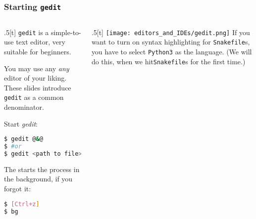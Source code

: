 \begin{frame}[fragile]
  \frametitle{Starting \texttt{gedit}}
  \begin{columns}[t]
  	 \begin{column}{.5\textwidth}[t]
  	   \texttt{gedit} is a simple-to-use text editor, very suitable for beginners.\newline
  	   \begin{hint}
  	     You may use any \emph{any} editor of your liking. These slides introduce \texttt{gedit} as a common denominator.
  	   \end{hint}
        Start \textit{gedit}:
       \begin{lstlisting}[language=Bash, style=Shell]
$ gedit @&@
$ #or
$ gedit <path to file> @&@
      \end{lstlisting}
      The  starts the process in the background, if you forgot it:
      \begin{lstlisting}[language=Bash, style=Shell]
$ [Ctrl+z]
$ bg
      \end{lstlisting}	
    \end{column}
    \begin{column}{.5\textwidth}[t]
      \texttt{[image: editors\_and\_IDEs/gedit.png]}	
      If you want to turn on syntax highlighting for \texttt{Snakefile}s, you have to select \texttt{Python3} as the language. (We will do this, when we hit\texttt{Snakefile}s for the first time.)
    \end{column} 
  \end{columns}
\end{frame}